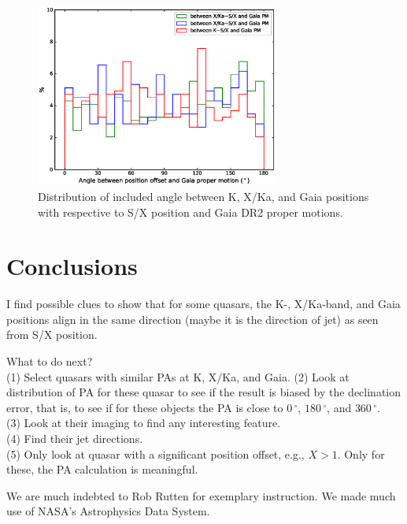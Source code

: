 \documentclass{aa}   %
\begin{document}
\begin{figure}[hbtp]
    \centering
    \includegraphics[width=80mm]{figs/pa-pm-nosys}
    \caption[]{\label{fig:pa-pm-nosys}
        Distribution of included angle between K, X/Ka, and Gaia positions with respective to S/X position and Gaia DR2 proper motions. 
    }
\end{figure}


\section{Conclusions} \label{sec:conclusions}

I find possible clues to show that for some quasars, the K-, X/Ka-band, and Gaia positions align in the same direction (maybe it is the direction of jet) as seen from S/X position.

What to do next?\\
(1) Select quasars with similar PAs at K, X/Ka, and Gaia.
(2) Look at distribution of PA for these quasar to see if the result is biased by the declination error, that is, to see if for these objects the PA is close to $0\,^\circ$, $180\,^\circ$, and $360\,^\circ$.\\
(3) Look at their imaging to find any interesting feature.\\
(4) Find their jet directions.\\
(5) Only look at quasar with a significant position offset, e.g., $X>1$. Only for these, the PA calculation is meaningful. 

\begin{acknowledgements}
  We are much indebted to Rob Rutten for exemplary instruction.
  We made much use of NASA's Astrophysics Data System.
\end{acknowledgements}


\end{document}
